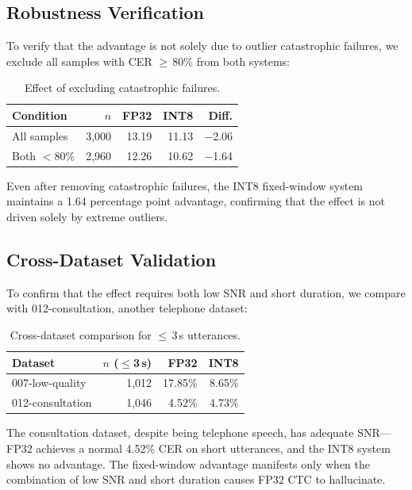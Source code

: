 \documentclass[a4paper,11pt,twocolumn]{article}
\begin{document}
\subsection{Robustness Verification}

To verify that the advantage is not solely due to outlier catastrophic failures, we exclude all samples with CER $\geq$\,80\% from both systems:

\begin{table}[t]
\centering
\caption{Effect of excluding catastrophic failures.}
\small
\begin{tabular}{@{}lrrrr@{}}
\toprule
Condition & $n$ & FP32 & INT8 & Diff. \\
\midrule
All samples & 3,000 & 13.19 & 11.13 & $-$2.06 \\
Both $<$80\% & 2,960 & 12.26 & 10.62 & $-$1.64 \\
\bottomrule
\end{tabular}
\end{table}

Even after removing catastrophic failures, the INT8 fixed-window system maintains a 1.64 percentage point advantage, confirming that the effect is not driven solely by extreme outliers.

\subsection{Cross-Dataset Validation}

To confirm that the effect requires both low SNR and short duration, we compare with 012-consultation, another telephone dataset:

\begin{table}[t]
\centering
\caption{Cross-dataset comparison for $\leq$\,3\,s utterances.}
\small
\begin{tabular}{@{}lrrr@{}}
\toprule
Dataset & $n$ ($\leq$3\,s) & FP32 & INT8 \\
\midrule
007-low-quality & 1,012 & 17.85\% & 8.65\% \\
012-consultation & 1,046 & 4.52\% & 4.73\% \\
\bottomrule
\end{tabular}
\end{table}

The consultation dataset, despite being telephone speech, has adequate SNR---FP32 achieves a normal 4.52\% CER on short utterances, and the INT8 system shows no advantage. The fixed-window advantage manifests only when the combination of low SNR and short duration causes FP32 CTC to hallucinate.
\end{document}

